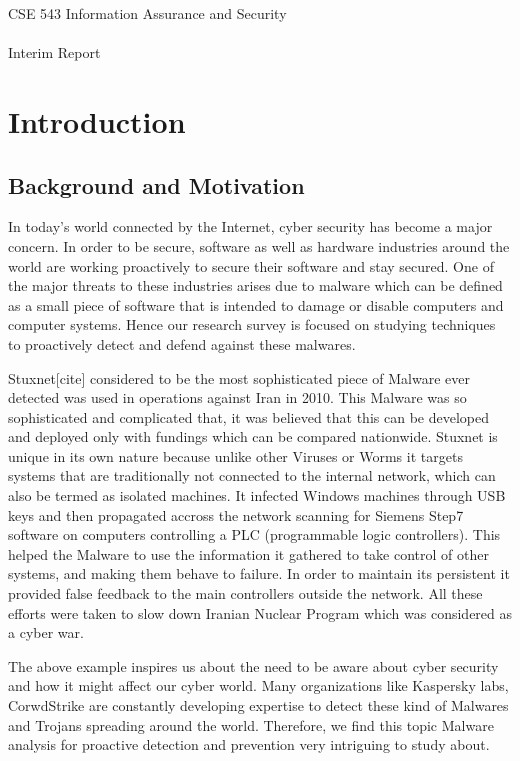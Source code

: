 \documentclass[14pt]{article}
\title{\fulltitle}
\author{Tejas Khairnar (1207690220, Group Leader) \\Sujay Vaishampayan (1209248166, Deputy Group Leader)\\  Zhibo Sun(1207644187)\\Harshil Maskai (1209174092)\\ Aloma Lopes (1209273126)\\ Chaitanya Palaka (1209261868)\\ Varun Chandrasekar (1209248010) \\ Kunal Bansal (1211213169) \\ Raj Dalvi (1209232176) \\ Vimal Vadivelu (1209203043)\\ \\
		Arizona State University}
\begin{document}
	\begingroup
		\fontsize{15pt}{15pt}\selectfont
		\begin{center}
			CSE 543 Information Assurance and Security \\~\\
			Interim Report
		\end{center}
	\endgroup
	{\let\newpage\relax\maketitle}
	\section{Introduction}
	\subsection{Background and Motivation}
	In today’s world connected by the Internet, cyber security has become a major concern. In order
to be secure, software as well as hardware industries around the world are working proactively to
secure their software and stay secured. One of the major threats to these industries arises due to
malware which can be defined as a small piece of software that is intended to damage or disable
computers and computer systems. Hence our research survey is focused on studying techniques
to proactively detect and defend against these malwares.

Stuxnet[cite] considered to be the most sophisticated piece of Malware ever detected was used in operations against Iran in 2010. This Malware was so sophisticated and complicated that, it was believed that this can be developed and deployed only with fundings which can be compared nationwide. Stuxnet is unique in its own nature because unlike other Viruses or Worms it targets systems that are traditionally not connected to the internal network, which can also be termed as isolated machines. It infected Windows machines through USB keys and then propagated accross the network scanning for Siemens Step7 software on computers controlling a PLC (programmable logic controllers). This helped the Malware to use the information it gathered to take control of other systems, and making them behave to failure. In order to maintain its persistent it provided false feedback to the main controllers outside the network. All these efforts were taken to slow down Iranian Nuclear Program which was considered as a cyber war.

The above example inspires us about the need to be aware about cyber security and how it might affect our cyber world. Many organizations like Kaspersky labs, CorwdStrike are constantly developing expertise to detect these kind of Malwares and Trojans spreading around the world. Therefore, we find this topic Malware analysis for proactive detection and prevention very intriguing to study about.
\end{document}
